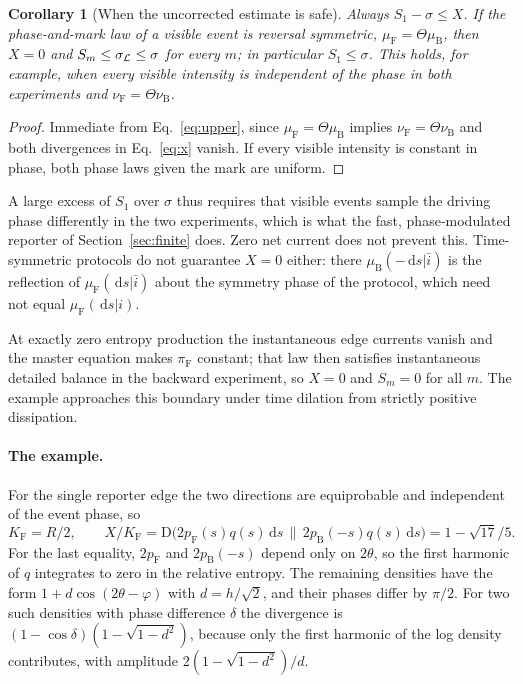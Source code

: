 \documentclass[11pt,a4paper]{article}
\newtheorem{corollary}[theorem]{Corollary}
\newcommand{\KL}{\mathrm D}
\newcommand{\F}{\mathrm F}
\newcommand{\B}{\mathrm B}
\newcommand{\dd}{\,\mathrm d}
\begin{document}
\begin{corollary}[When the uncorrected estimate is safe]\label{cor:safe}
Always $S_1-\sigma\le X$. If the phase-and-mark law of a visible event is reversal symmetric, $\mu_\F=\Theta\mu_\B$, then $X=0$ and $S_m\le\sigma_{\cal L}\le\sigma$ for every $m$; in particular $S_1\le\sigma$. This holds, for example, when every visible intensity is independent of the phase in both experiments and $\nu_\F=\Theta\nu_\B$.
\end{corollary}
\begin{proof}
Immediate from Eq.~\eqref{eq:upper}, since $\mu_\F=\Theta\mu_\B$ implies $\nu_\F=\Theta\nu_\B$ and both divergences in Eq.~\eqref{eq:x} vanish. If every visible intensity is constant in phase, both phase laws given the mark are uniform.
\end{proof}
A large excess of $S_1$ over $\sigma$ thus requires that visible events sample the driving phase differently in the two experiments, which is what the fast, phase-modulated reporter of Section~\ref{sec:finite} does. Zero net current does not prevent this. Time-symmetric protocols do not guarantee $X=0$ either: there $\mu_\B(-\dd s|\bar i)$ is the reflection of $\mu_\F(\dd s|\bar i)$ about the symmetry phase of the protocol, which need not equal $\mu_\F(\dd s|i)$.

At exactly zero entropy production the instantaneous edge currents vanish and the master equation makes $\pi_\F$ constant; that law then satisfies instantaneous detailed balance in the backward experiment, so $X=0$ and $S_m=0$ for all $m$. The example approaches this boundary under time dilation from strictly positive dissipation.

\paragraph{The example.} For the single reporter edge the two directions are equiprobable and independent of the event phase, so
\begin{equation}
 K_\F=R/2,\qquad X/K_\F
 =\KL\big(2p_\F(s)q(s)\dd s\,\big\|\,2p_\B(-s)q(s)\dd s\big)
 =1-\sqrt{17}/5 .\label{eq:xvalue}
\end{equation}
For the last equality, $2p_\F$ and $2p_\B(-s)$ depend only on $2\theta$, so the first harmonic of $q$ integrates to zero in the relative entropy. The remaining densities have the form $1+d\cos(2\theta-\varphi)$ with $d=h/\sqrt{2}$, and their phases differ by $\pi/2$. For two such densities with phase difference $\delta$ the divergence is $(1-\cos\delta)(1-\sqrt{1-d^2})$, because only the first harmonic of the log density contributes, with amplitude $2(1-\sqrt{1-d^2})/d$.
\end{document}

